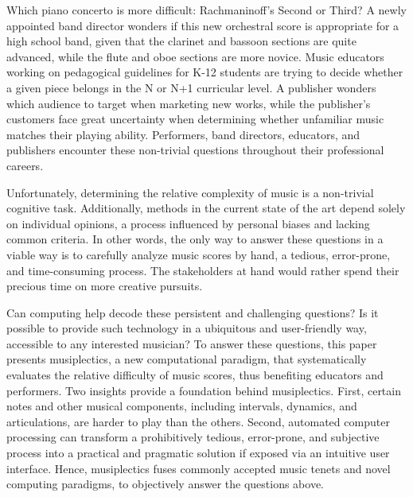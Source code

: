 \documentclass[10pt,preprint]{sigplanconf}
\begin{document}


Which piano concerto is more difficult: Rachmaninoff's Second or Third? A newly appointed band director wonders if this new orchestral score is appropriate for a high school band, given that the clarinet and bassoon sections are quite advanced, while the flute and oboe sections are more novice. Music educators working on pedagogical guidelines for K-12 students are trying to decide whether a given piece belongs in the N or N+1 curricular level. A publisher wonders which audience to target when marketing new works, while the publisher's customers face great uncertainty when determining whether unfamiliar music matches their playing ability. Performers, band directors, educators, and publishers encounter these non-trivial questions throughout their professional careers. 


Unfortunately, determining the relative complexity of music is a non-trivial cognitive task. Additionally, methods in the current state of the art depend solely on individual opinions, a process influenced by personal biases and lacking common criteria. In other words, the only way to answer these questions in a viable way is to carefully analyze music scores by hand, a tedious, error-prone, and time-consuming process. The stakeholders at hand would rather spend their precious time on more creative pursuits.

Can computing help decode these persistent and challenging questions? Is it possible to provide such technology in a ubiquitous and user-friendly way, accessible to any interested musician? To answer these questions, this paper presents musiplectics, a new computational paradigm, that systematically evaluates the relative difficulty of music scores, thus benefiting educators and performers. Two insights provide a foundation behind musiplectics. First, certain notes and other musical components, including intervals, dynamics, and articulations, are harder to play than the others. Second, automated computer processing can transform a prohibitively tedious, error-prone, and subjective process into a practical and pragmatic solution if exposed via an intuitive user interface. Hence, musiplectics fuses commonly accepted music tenets and novel computing paradigms, to objectively answer the questions above. 
\end{document}
